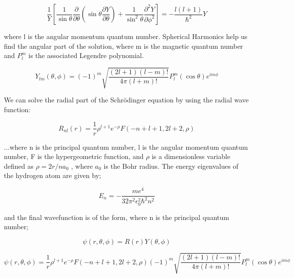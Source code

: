 \documentclass{article}
\begin{document}
\begin{equation}
\frac{1}{Y}\left[\frac{1}{\sin\theta}\frac{\partial}{\partial\theta}\left(\sin\theta\frac{\partial Y}{\partial\theta}\right) + \frac{1}{\sin^2\theta}\frac{\partial^2 Y}{\partial\phi^2}\right] = -\frac{l(l+1)}{\hbar^2}Y
\end{equation}

where l is the angular momentum quantum number. Spherical Harmonics help us find the angular part of the solution, where m is the magnetic quantum number and \begin{math} P_l^m \end{math} is the associated Legendre polynomial.

\begin{equation}
Y_{lm}(\theta,\phi) = (-1)^m\sqrt{\frac{(2l+1)(l-m)!}{4\pi(l+m)!}}P_l^m(\cos\theta)e^{im\phi}
\end{equation}

\vspace{0.5cm}

We can solve the radial part of the Schrödinger equation by using the radial wave function:

\begin{equation}
R_{nl}(r) = \frac{1}{r}\rho^{l+1}e^{-\rho}F(-n+l+1,2l+2,\rho)
\end{equation}

...where n is the principal quantum number, l is the angular momentum quantum number, F is the hypergeometric function, and \begin{math} \rho \end{math} is a dimensionless variable defined as \begin{math} \rho = 2r/na_0 \end{math} , where \begin{math} a_0 \end{math} is the Bohr radius. The energy eigenvalues of the hydrogen atom are given by;

\begin{equation} 
E_n = -\frac{me^4}{32\pi^2\epsilon_0^2\hbar^2n^2} 
\end{equation}

and the final wavefunction is of the form, where n is the principal quantum number;

\begin{equation}
 \psi(r,\theta,\phi) = R(r)Y(\theta,\phi)
\end{equation}

\begin{equation}
 \psi(r,\theta,\phi)  = \frac{1}{r}\rho^{l+1}e^{-\rho}F(-n+l+1,2l+2,\rho)(-1)^m\sqrt{\frac{(2l+1)(l-m)!}{4\pi(l+m)!}}P_l^m(\cos\theta)e^{im\phi}
\end{equation}
\end{document}
